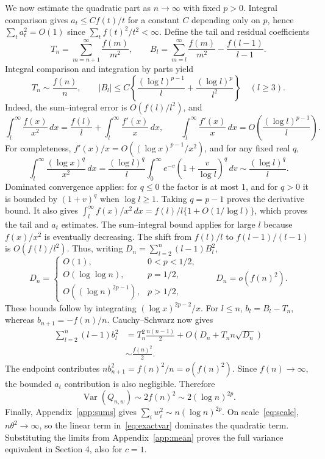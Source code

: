 \documentclass[11pt]{article}
\theoremstyle{definition}
\begin{document}
We now estimate the quadratic part as $n\to\infty$ with fixed $p>0$.
Integral comparison gives
$a_t\le C f(t)/t$ for a constant $C$ depending only on $p$, hence
$\sum_ta_t^2=O(1)$ since $\sum_tf(t)^2/t^2<\infty$.
Define the tail and residual coefficients
\[
T_n=\sum_{m=n+1}^{\infty}\frac{f(m)}{m^2},\qquad
B_l=\sum_{m=l}^{\infty}\frac{f(m)}{m^2}-\frac{f(l-1)}{l-1}.
\]
Integral comparison and integration by parts yield
\[
T_n\sim\frac{f(n)}n,\qquad
|B_l|\le C\left\{\frac{(\log l)^{p-1}}l
+\frac{(\log l)^p}{l^2}\right\}\quad(l\ge3).
\]
Indeed, the sum--integral error is $O(f(l)/l^2)$, and
\[
\int_l^\infty\frac{f(x)}{x^2}\,dx
=\frac{f(l)}l+\int_l^\infty\frac{f'(x)}x\,dx,\qquad
\int_l^\infty\frac{f'(x)}x\,dx
=O\!\left(\frac{(\log l)^{p-1}}l\right).
\]
For completeness, $f'(x)/x=O((\log x)^{p-1}/x^2)$, and for any
fixed real $q$,
\[
\int_l^\infty\frac{(\log x)^q}{x^2}\,dx
=\frac{(\log l)^q}{l}
\int_0^\infty e^{-v}\left(1+\frac v{\log l}\right)^q\,dv
\sim\frac{(\log l)^q}{l}.
\]
Dominated convergence applies: for $q\le0$ the factor is at most
$1$, and for $q>0$ it is bounded by $(1+v)^q$ when $\log l\ge1$.
Taking $q=p-1$ proves the derivative bound. It also gives
$\int_l^\infty f(x)/x^2\,dx=f(l)/l\{1+O(1/\log l)\}$,
which proves the tail and $a_t$ estimates. The sum--integral bound
applies for large $l$ because $f(x)/x^2$ is eventually decreasing.
The shift from $f(l)/l$ to
$f(l-1)/(l-1)$ is $O(f(l)/l^2)$.
Thus, writing $D_n=\sum_{l=2}^n(l-1)B_l^2$,
\[
D_n=\begin{cases}
O(1),&0<p<1/2,\\
O(\log\log n),&p=1/2,\\
O((\log n)^{2p-1}),&p>1/2,
\end{cases}
\qquad D_n=o(f(n)^2).
\]
These bounds follow by integrating $(\log x)^{2p-2}/x$.
For $l\le n$, $b_l=B_l-T_n$, whereas $b_{n+1}=-f(n)/n$.
Cauchy--Schwarz now gives
\[
\begin{split}
\sum_{l=2}^n(l-1)b_l^2
&=T_n^2\frac{n(n-1)}2
+O\!\left(D_n+T_n n\sqrt{D_n}\right)\\
&\sim\frac{f(n)^2}2.
\end{split}
\]
The endpoint contributes $n b_{n+1}^2=f(n)^2/n=o(f(n)^2)$.
Since $f(n)\to\infty$, the bounded $a_t$ contribution is also
negligible. Therefore
\[
\operatorname{Var}(Q_{n,w})\sim2f(n)^2\sim2(\log n)^{2p}.
\]
Finally, Appendix~\ref{app:sums} gives
$\sum_iw_i^2\sim n(\log n)^{2p}$. On scale~\eqref{eq:scale},
$n\theta^2\to\infty$, so the linear term in~\eqref{eq:exactvar}
dominates the quadratic term. Substituting the limits from
Appendix~\ref{app:mean} proves the full variance equivalent in Section 4,
also for $c=1$.
\end{document}
